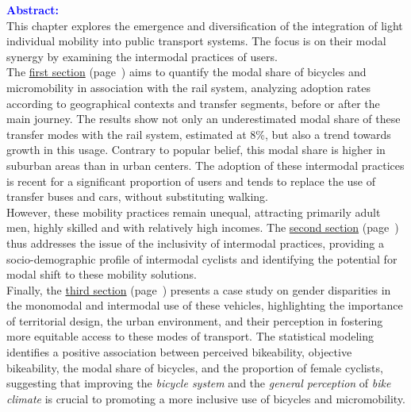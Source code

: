 \begin{refsegment}
    \newpage
    \begin{tcolorbox}[colback=white!5!white,
                      colframe=blue!75!blue,
                      title=
                      \bigskip
                      \center{\textbf{Preamble of Chapter~4}}
                      \\
                      \raggedright{\small{Chapter composed of \pagedifference{chap4:titre}{chap5:titre} pages, including \pagedifference{chap4:bibliographie}{chap5:titre} pages of bibliography}}
                      \bigskip]
\Large{\textcolor{blue}{\textbf{Abstract:}}}
    \\
\small{
This chapter explores the emergence and diversification of the integration of light individual mobility into public transport systems. The focus is on their modal synergy by examining the intermodal practices of users.%
    \\
The \hyperref[section-chap4:progression-velo-micromobilite-aubaine]{first section} (page~\pageref{section-chap4:progression-velo-micromobilite-aubaine}) aims to quantify the modal share of bicycles and micromobility in association with the rail system, analyzing adoption rates according to geographical contexts and transfer segments, before or after the main journey. The results show not only an underestimated modal share of these transfer modes with the rail system, estimated at 8\%, but also a trend towards growth in this usage. Contrary to popular belief, this modal share is higher in suburban areas than in urban centers. The adoption of these intermodal practices is recent for a significant proportion of users and tends to replace the use of transfer buses and cars, without substituting walking.%
    \\
However, these mobility practices remain unequal, attracting primarily adult men, highly skilled and with relatively high incomes. The \hyperref[section-chap4:profil-sociodemographique]{second section} (page~\pageref{section-chap4:profil-sociodemographique}) thus addresses the issue of the inclusivity of intermodal practices, providing a socio-demographic profile of intermodal cyclists and identifying the potential for modal shift to these mobility solutions.%
    \\
Finally, the \hyperref[section-chap4:cyclabilite-genre]{third section} (page~\pageref{section-chap4:cyclabilite-genre}) presents a case study on gender disparities in the monomodal and intermodal use of these vehicles, highlighting the importance of territorial design, the urban environment, and their perception in fostering more equitable access to these modes of transport. The statistical modeling identifies a positive association between perceived bikeability, objective bikeability, the modal share of bicycles, and the proportion of female cyclists, suggesting that improving the \textsl{bicycle system} and the \textsl{general perception} of \textsl{bike climate} is crucial to promoting a more inclusive use of bicycles and micromobility.%
}
\end{tcolorbox}
\end{refsegment}
